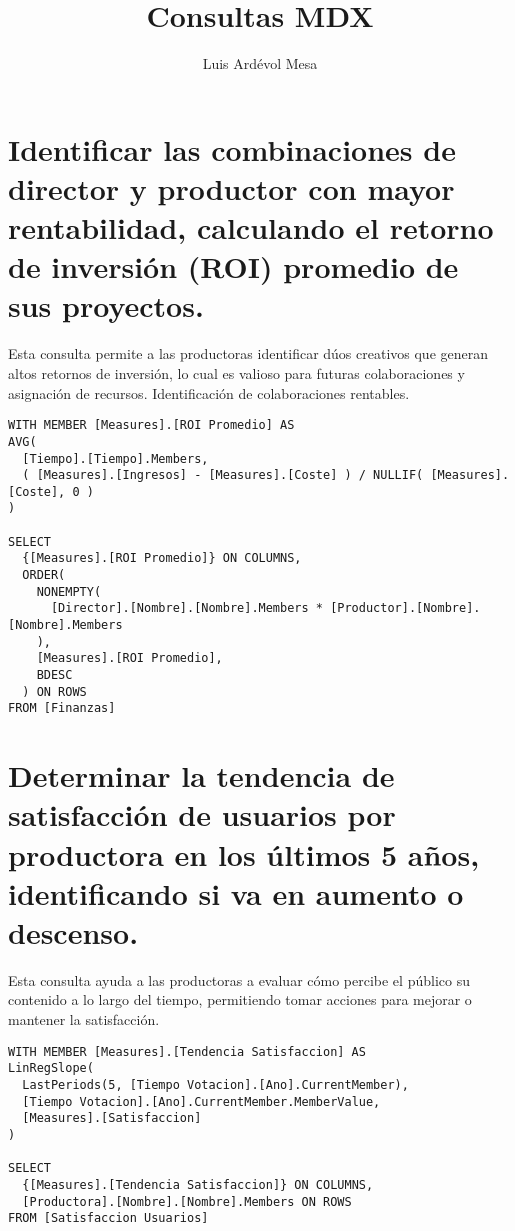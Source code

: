 \documentclass[11pt]{opticajnl}
\title{Consultas MDX}
\author[1,2,3]{Luis Ardévol Mesa}
\begin{document}
\maketitle

\section{Identificar las combinaciones de director y productor con mayor rentabilidad, calculando el retorno de inversión (ROI) promedio de sus proyectos.}

Esta consulta permite a las productoras identificar dúos creativos que generan altos retornos de inversión, lo cual es valioso para futuras colaboraciones y asignación de recursos. Identificación de colaboraciones rentables.

\begin{lstlisting}[style=terminal]
WITH MEMBER [Measures].[ROI Promedio] AS
AVG(
  [Tiempo].[Tiempo].Members,
  ( [Measures].[Ingresos] - [Measures].[Coste] ) / NULLIF( [Measures].[Coste], 0 )
)

SELECT 
  {[Measures].[ROI Promedio]} ON COLUMNS,
  ORDER(
    NONEMPTY(
      [Director].[Nombre].[Nombre].Members * [Productor].[Nombre].[Nombre].Members
    ),
    [Measures].[ROI Promedio],
    BDESC
  ) ON ROWS
FROM [Finanzas]
\end{lstlisting}


\section{Determinar la tendencia de satisfacción de usuarios por productora en los últimos 5 años, identificando si va en aumento o descenso.}

Esta consulta ayuda a las productoras a evaluar cómo percibe el público su contenido a lo largo del tiempo, permitiendo tomar acciones para mejorar o mantener la satisfacción.


\begin{lstlisting}[style=terminal]
WITH MEMBER [Measures].[Tendencia Satisfaccion] AS
LinRegSlope(
  LastPeriods(5, [Tiempo Votacion].[Ano].CurrentMember), 
  [Tiempo Votacion].[Ano].CurrentMember.MemberValue, 
  [Measures].[Satisfaccion]
)

SELECT 
  {[Measures].[Tendencia Satisfaccion]} ON COLUMNS,
  [Productora].[Nombre].[Nombre].Members ON ROWS
FROM [Satisfaccion Usuarios]
\end{lstlisting}
\end{document}
